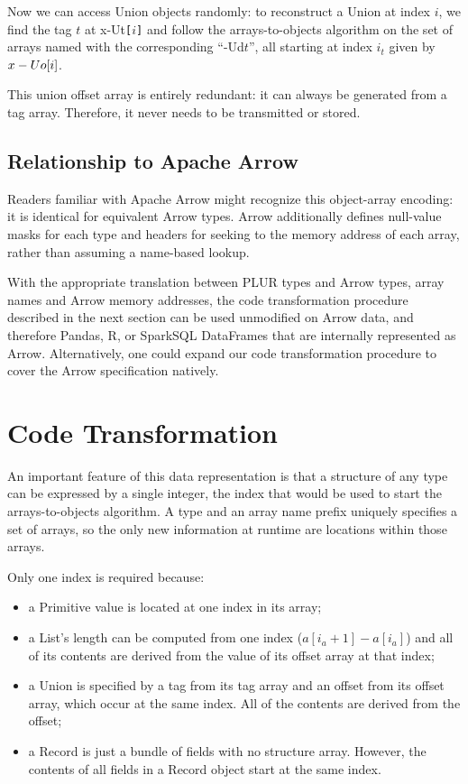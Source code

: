 \documentclass[10pt, conference, compsocconf]{IEEEtran}
\begin{document}
Now we can access Union objects randomly: to reconstruct a Union at index $i$, we find the tag $t$ at x-Ut{\tt [}$i${\tt ]} and follow the arrays-to-objects algorithm on the set of arrays named with the corresponding ``-Ud$t$'', all starting at index $i_t$ given by $\mbox{x-Uo{\tt [}}i\mbox{\tt]}$.

This union offset array is entirely redundant: it can always be generated from a tag array. Therefore, it never needs to be transmitted or stored.

\subsection{Relationship to Apache Arrow}

Readers familiar with Apache Arrow might recognize this object-array encoding\cite{arrow-layout}: it is identical for equivalent Arrow types. Arrow additionally defines null-value masks for each type and headers for seeking to the memory address of each array, rather than assuming a name-based lookup.

With the appropriate translation between PLUR types and Arrow types, array names and Arrow memory addresses, the code transformation procedure described in the next section can be used unmodified on Arrow data, and therefore Pandas\cite{pandas}, R\cite{R}, or SparkSQL\cite{sparksql} DataFrames that are internally represented as Arrow. Alternatively, one could expand our code transformation procedure to cover the Arrow specification natively.

\section{Code Transformation}

An important feature of this data representation is that a structure of any type can be expressed by a single integer, the index that would be used to start the arrays-to-objects algorithm. A type and an array name prefix uniquely specifies a set of arrays, so the only new information at runtime are locations within those arrays.

Only one index is required because:
\begin{itemize}
\item a Primitive value is located at one index in its array;
\item a List's length can be computed from one index \mbox{($a[i_a + 1] - a[i_a]$)} and all of its contents are derived from the value of its offset array at that index;
\item a Union is specified by a tag from its tag array and an offset from its offset array, which occur at the same index. All of the contents are derived from the offset;
\item a Record is just a bundle of fields with no structure array. However, the contents of all fields in a Record object start at the same index.
\end{itemize}
\end{document}
